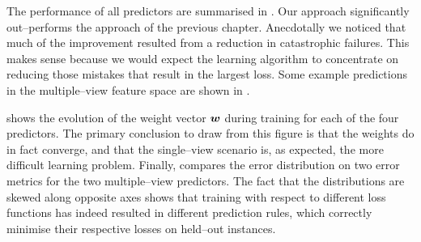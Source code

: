 The performance of all predictors are summarised in
. Our approach significantly
out--performs the approach of the previous chapter. Anecdotally we
noticed that much of the improvement resulted from a reduction in
catastrophic failures. This makes sense because we would expect the
learning algorithm to concentrate on reducing those mistakes that
result in the largest loss. Some example predictions in the
multiple--view feature space are shown in .

 shows the evolution of the weight vector
$\Model$ during training for each of the four predictors. The primary
conclusion to draw from this figure is that the weights do in fact
converge, and that the single--view scenario is, as expected, the more
difficult learning problem. Finally,
 compares the error distribution on two
error metrics for the two multiple--view predictors. The fact that the
distributions are skewed along opposite axes shows that training
with respect to different loss functions has indeed resulted in
different prediction rules, which correctly minimise their respective
losses on held--out instances.

